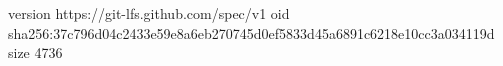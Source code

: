version https://git-lfs.github.com/spec/v1
oid sha256:37c796d04c2433e59e8a6eb270745d0ef5833d45a6891c6218e10cc3a034119d
size 4736
